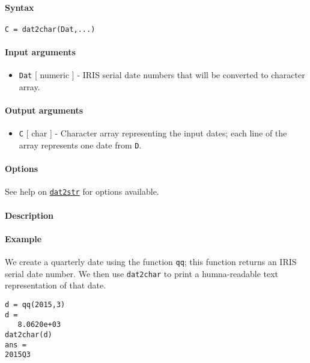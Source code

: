 


	\paragraph{Syntax}

\begin{verbatim}
C = dat2char(Dat,...)
\end{verbatim}

\paragraph{Input arguments}

\begin{itemize}
\itemsep1pt\parskip0pt
\item
  \texttt{Dat} {[} numeric {]} - IRIS serial date numbers that will be
  converted to character array.
\end{itemize}

\paragraph{Output arguments}

\begin{itemize}
\itemsep1pt\parskip0pt
\item
  \texttt{C} {[} char {]} - Character array representing the input
  dates; each line of the array represents one date from \texttt{D}.
\end{itemize}

\paragraph{Options}

See help on \href{dates/dat2str}{\texttt{dat2str}} for options
available.

\paragraph{Description}

\paragraph{Example}

We create a quarterly date using the function \texttt{qq}; this function
returns an IRIS serial date number. We then use \texttt{dat2char} to
print a humna-readable text representation of that date.

\begin{verbatim}
d = qq(2015,3)
d =
   8.0620e+03
dat2char(d)
ans =
2015Q3
\end{verbatim}


